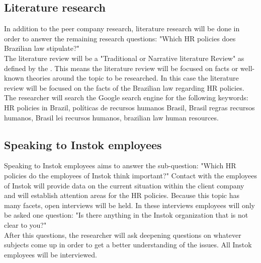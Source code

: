 \documentclass[man]{apa6}
\begin{document}
\subsection{Literature research}
In addition to the peer company research, literature research will be done in order to answer the remaining research questions: "Which HR policies does Brazilian law stipulate?" \\
The literature review will be a "Traditional or Narrative literature Review" as defined by the \cite{TOLEDO2016}. This means the literature review will be focused on facts or well-known theories around the topic to be researched. In this case the literature review will be focused on the facts of the Brazilian law regarding HR policies. The researcher will search the Google search engine for the following keywords: HR policies in Brazil, políticas de recursos humanos Brasil, Brasil regras recursos humanos, Brasil lei recursos humanos, brazilian law human resources.

\subsection{Speaking to Instok employees}
Speaking to Instok employees aims to answer the sub-question: "Which HR policies do the employees of Instok think important?" Contact with the employees of Instok will provide data on the current situation within the client company and will establish attention areas for the HR policies. Because this topic has many facets, open interviews will be held. In these interviews employees will only be asked one question: "Is there anything in the Instok organization that is not clear to you?"\\
After this questions, the researcher will ask deepening questions on whatever subjects come up in order to get a better understanding of the issues. All Instok employees will be interviewed.
\end{document}
